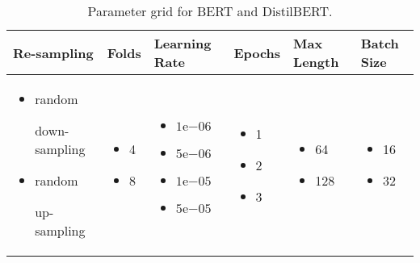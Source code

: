 \begin{table}[htpb]
    \centering
    \begin{tabular}{ p{3.5cm} p{1.5cm} p{2cm} p{1.5cm} p{1.6cm} p{1.5cm} }
        \toprule
         Re-sampling & Folds & Learning Rate & Epochs & Max Length & Batch Size \\
        \midrule
            \begin{itemize}[noitemsep,topsep=0pt,leftmargin=15pt]
                \item {random

                down-sampling}
                \item {random

                up-sampling}
            \end{itemize}
            &\begin{itemize}[noitemsep,topsep=0pt,leftmargin=15pt]
                \item 4
                \item 8
            \end{itemize}
            & \begin{itemize}[noitemsep,topsep=0pt,leftmargin=15pt]
                \item $1\mathrm{e}{-06}$
                \item $5\mathrm{e}{-06}$
                \item $1\mathrm{e}{-05}$
                \item $5\mathrm{e}{-05}$
            \end{itemize}
            & \begin{itemize}[noitemsep,topsep=0pt,leftmargin=15pt]
                \item 1
                \item 2
                \item 3
            \end{itemize}
            & \begin{itemize}[noitemsep,topsep=0pt,leftmargin=15pt]
                \item 64
                \item 128
            \end{itemize}
            & \begin{itemize}[noitemsep,topsep=0pt,leftmargin=15pt]
                \item 16
                \item 32
            \end{itemize}\\
        \bottomrule
    \end{tabular}
    \caption[Parameter Grid for \ac{BERT} and \ac{DistilBERT}]{Parameter grid for \ac{BERT} and \ac{DistilBERT}.}\label{tab:study:execution:paramter_grid:BERT}
\end{table}

